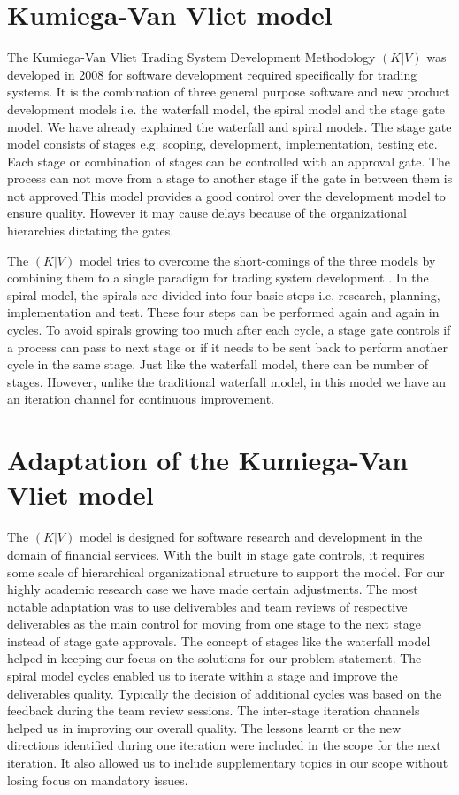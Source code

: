 \section{Kumiega-Van Vliet model}\label{kvvm}   
      
The Kumiega-Van Vliet Trading System Development Methodology \((K|V)\) was developed in 2008 for software development required specifically for trading systems. It is the combination of three general purpose software and new product development models i.e. the waterfall model, the spiral model and the stage gate model. We have already explained the waterfall and spiral models. The stage gate model consists of stages e.g. scoping, development, implementation, testing etc. Each stage or combination of stages can be controlled with an approval gate. The process can not move from a stage to another stage if the gate in between them is not approved.This model provides a good control over the development model to ensure quality. However it may cause delays because of the organizational hierarchies dictating the gates.

 The \((K|V)\) model tries to overcome the short-comings of the three models by combining them to a single paradigm for trading system development \cite{kumiega2008software}. In the spiral model, the spirals are divided into four basic steps i.e. research, planning, implementation and test. These four steps can be performed again and again in cycles. To avoid spirals  growing too much after each cycle, a stage gate controls if a process can pass to next stage or if it needs to be sent back to perform another cycle in the same stage. Just like the waterfall model, there can be number of stages. However, unlike the traditional waterfall model, in this model we have an an iteration channel for continuous improvement.

 \section{Adaptation of the Kumiega-Van Vliet model}\label{adaptation}
 The \((K|V)\) model is designed for software research  and development in the domain of financial services. With the built in stage gate controls, it requires some scale of hierarchical organizational structure to support the model. For our highly academic research case we have made certain adjustments. The most notable adaptation was to use deliverables and team reviews of respective deliverables as the main control for moving from one stage to the next stage instead of stage gate approvals. The concept of stages like the waterfall model helped in keeping our focus on the solutions for our problem statement. The spiral model cycles enabled us to iterate within a stage and improve the deliverables quality. Typically the decision of additional cycles was based on the feedback during the team review sessions. The inter-stage iteration channels helped us in improving our overall quality. The lessons learnt or the new directions identified during one iteration were included in the scope for the next iteration. It also allowed us to include supplementary topics in our scope without losing focus on mandatory issues.
 
